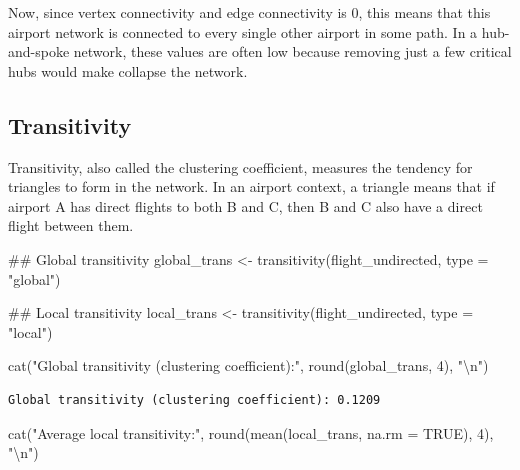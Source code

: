\documentclass[
  letterpaper,
]{report}
\newenvironment{Shaded}{}{}
\newcommand{\AttributeTok}[1]{\textcolor[rgb]{0.84,0.23,0.29}{#1}}
\newcommand{\ConstantTok}[1]{\textcolor[rgb]{0.00,0.36,0.77}{#1}}
\newcommand{\DecValTok}[1]{\textcolor[rgb]{0.00,0.36,0.77}{#1}}
\newcommand{\DocumentationTok}[1]{\textcolor[rgb]{0.42,0.45,0.49}{#1}}
\newcommand{\FunctionTok}[1]{\textcolor[rgb]{0.44,0.26,0.76}{#1}}
\newcommand{\NormalTok}[1]{\textcolor[rgb]{0.14,0.16,0.18}{#1}}
\newcommand{\OtherTok}[1]{\textcolor[rgb]{0.44,0.26,0.76}{#1}}
\newcommand{\SpecialCharTok}[1]{\textcolor[rgb]{0.00,0.36,0.77}{#1}}
\newcommand{\StringTok}[1]{\textcolor[rgb]{0.01,0.18,0.38}{#1}}
\begin{document}
Now, since vertex connectivity and edge connectivity is 0, this means
that this airport network is connected to every single other airport in
some path. In a hub-and-spoke network, these values are often low
because removing just a few critical hubs would make collapse the
network.

\subsection{Transitivity}\label{transitivity}

Transitivity, also called the clustering coefficient, measures the
tendency for triangles to form in the network. In an airport context, a
triangle means that if airport A has direct flights to both B and C,
then B and C also have a direct flight between them.

\begin{Shaded}
\begin{Highlighting}[]
\DocumentationTok{\#\# Global transitivity}
\NormalTok{global\_trans }\OtherTok{\textless{}{-}} \FunctionTok{transitivity}\NormalTok{(flight\_undirected, }\AttributeTok{type =} \StringTok{"global"}\NormalTok{)}

\DocumentationTok{\#\# Local transitivity}
\NormalTok{local\_trans }\OtherTok{\textless{}{-}} \FunctionTok{transitivity}\NormalTok{(flight\_undirected, }\AttributeTok{type =} \StringTok{"local"}\NormalTok{)}

\FunctionTok{cat}\NormalTok{(}\StringTok{"Global transitivity (clustering coefficient):"}\NormalTok{, }\FunctionTok{round}\NormalTok{(global\_trans, }\DecValTok{4}\NormalTok{), }\StringTok{"}\SpecialCharTok{\textbackslash{}n}\StringTok{"}\NormalTok{)}
\end{Highlighting}
\end{Shaded}

\begin{verbatim}
Global transitivity (clustering coefficient): 0.1209 
\end{verbatim}

\begin{Shaded}
\begin{Highlighting}[]
\FunctionTok{cat}\NormalTok{(}\StringTok{"Average local transitivity:"}\NormalTok{, }\FunctionTok{round}\NormalTok{(}\FunctionTok{mean}\NormalTok{(local\_trans, }\AttributeTok{na.rm =} \ConstantTok{TRUE}\NormalTok{), }\DecValTok{4}\NormalTok{), }\StringTok{"}\SpecialCharTok{\textbackslash{}n}\StringTok{"}\NormalTok{)}
\end{Highlighting}
\end{Shaded}
\end{document}
